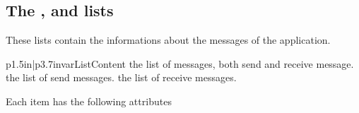 \subsection{The ,  and  lists}

These lists contain the informations about the messages of the application.

\begin{longtableii}{p{1.5in}|p{3.7in}}{var}{List}{Content}
  {the list of messages, both send and receive message.}
  {the list of send messages.}
  {the list of receive messages.}
\end{longtableii}

Each item has the following attributes

